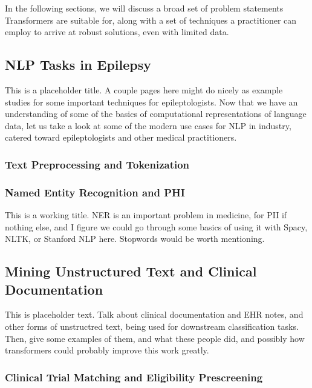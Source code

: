 In the following sections, we will discuss a broad set of problem statements Transformers are suitable for, along with a set of techniques a practitioner can employ to arrive at robust solutions, even with limited data.


\subsection{NLP Tasks in Epilepsy}
This is a placeholder title. A couple pages here might do nicely as example studies for some important techniques for epileptologists.
Now that we have an understanding of some of the basics of computational representations of language data, let us take a look at some of the modern use cases for NLP in industry,
catered toward epileptologists and other medical practitioners.

\subsubsection{Text Preprocessing and Tokenization}

\subsubsection{Named Entity Recognition and PHI}

This is a working title. NER is an important problem in medicine, for PII if nothing else, and I figure we could go through some basics of using it with Spacy, NLTK, or Stanford NLP here.
Stopwords would be worth mentioning.

\subsection{Mining Unstructured Text and Clinical Documentation}

This is placeholder text. Talk about clinical documentation and EHR notes, and other forms of unstructred text, being used for downstream classification tasks.
Then, give some examples of them, and what these people did, and possibly how transformers could probably improve this work greatly.

\subsubsection{Clinical Trial Matching and Eligibility Prescreening}

